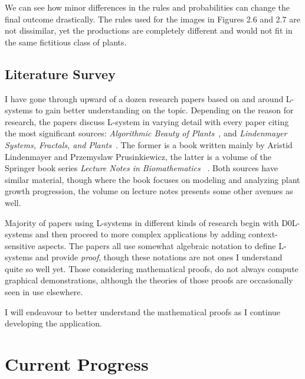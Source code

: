\documentclass[]{interim_report}
\begin{document}
We can see how minor differences in the rules and probabilities can change the final outcome drastically. The rules used for the images in Figures 2.6 and 2.7 are not dissimilar, yet the productions are completely different and would not fit in the same fictitious class of plants.

\section{Literature Survey}

I have gone through upward of a dozen research papers based on and around L-systems to gain better understanding on the topic. Depending on the reason for research, the papers discuss L-system in varying detail with every paper citing the most significant sources: \emph{Algorithmic Beauty of Plants~\cite{PRU:1990}}, and \emph{Lindenmayer Systems, Fractals, and Plants~\cite{HAN:1989}}. The former is a book written mainly by Aristid Lindenmayer and Przemyslaw Prusinkiewicz, the latter is a volume of the Springer book series \emph{Lecture Notes in Biomathematics~\cite{SPR}} . Both sources have similar material, though where the book focuses on modeling and analyzing plant growth progression, the volume on lecture notes presents some other avenues as well. 

Majority of papers using L-systems in different kinds of research begin with D0L-systems and then proceed to more complex applications by adding context-sensitive aspects. The papers all use somewhat algebraic notation to define L-systems and provide \emph{proof}, though these notations are not ones I understand quite so well yet. Those considering mathematical proofs, do not always compute graphical demonstrations, although the theories of those proofs are occasionally seen in use elsewhere. 

I will endeavour to better understand the mathematical proofs as I continue developing the application. 

\chapter{Current Progress}
\end{document}

